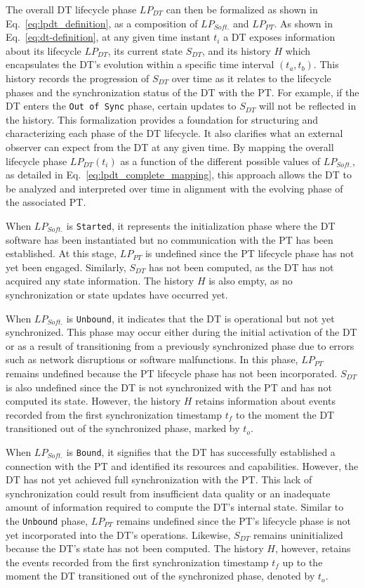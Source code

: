 The overall DT lifecycle phase $LP_{DT}$ can then be formalized as shown in Eq.~\ref{eq:lpdt_definition}, as a composition of $LP_{Soft.}$ and $LP_{PT}$.
%
As shown in Eq.~\ref{eq:dt-definition}, at any given time instant $t_i$ a DT exposes information about its lifecycle $LP_{DT}$, its current state $S_{DT}$, and its history $H$ which encapsulates the DT's evolution within a specific time interval $(t_a, t_b)$.
This history records the progression of $S_{DT}$ over time as it relates to the lifecycle phases and the synchronization status of the DT with the PT.
For example, if the DT enters the \texttt{Out of Sync} phase, certain updates to $S_{DT}$ will not be reflected in the history.
This formalization provides a foundation for structuring and characterizing each phase of the DT lifecycle.
It also clarifies what an external observer can expect from the DT at any given time. By mapping the overall lifecycle phase $LP_{DT}(t_{i})$ as a function of the different possible values of $LP_{Soft.}$, as detailed in Eq.~\ref{eq:lpdt_complete_mapping}, this approach allows the DT to be analyzed and interpreted over time in alignment with the evolving phase of the associated PT.

When $LP_{Soft.}$ is \texttt{Started}, it represents the initialization phase where the DT software has been instantiated but no communication with the PT has been established. At this stage, $LP_{PT}$ is undefined since the PT lifecycle phase has not yet been engaged. Similarly, $S_{DT}$ has not been computed, as the DT has not acquired any state information. The history $H$ is also empty, as no synchronization or state updates have occurred yet.

When $LP_{Soft.}$ is \texttt{Unbound}, it indicates that the DT is operational but not yet synchronized. This phase may occur either during the initial activation of the DT or as a result of transitioning from a previously synchronized phase due to errors such as network disruptions or software malfunctions. In this phase, $LP_{PT}$ remains undefined because the PT lifecycle phase has not been incorporated. $S_{DT}$ is also undefined since the DT is not synchronized with the PT and has not computed its state. However, the history $H$ retains information about events recorded from the first synchronization timestamp $t_{f}$ to the moment the DT transitioned out of the synchronized phase, marked by $t_{o}$.

When $LP_{Soft.}$ is \texttt{Bound}, it signifies that the DT has successfully established a connection with the PT and identified its resources and capabilities. However, the DT has not yet achieved full synchronization with the PT. This lack of synchronization could result from insufficient data quality or an inadequate amount of information required to compute the DT's internal state. Similar to the \texttt{Unbound} phase, $LP_{PT}$ remains undefined since the PT's lifecycle phase is not yet incorporated into the DT's operations. Likewise, $S_{DT}$ remains uninitialized because the DT's state has not been computed. The history $H$, however, retains the events recorded from the first synchronization timestamp $t_{f}$ up to the moment the DT transitioned out of the synchronized phase, denoted by $t_{o}$.

